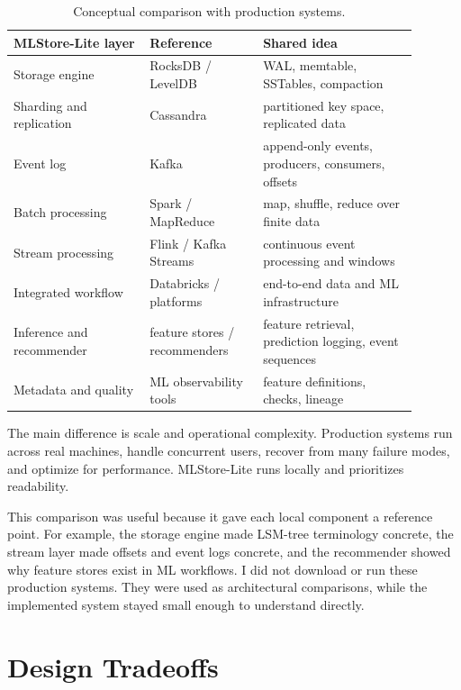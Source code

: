 \begin{table}[!htbp]
\centering
\footnotesize
\setlength{\tabcolsep}{4pt}
\renewcommand{\arraystretch}{0.95}
\begin{tabular}{p{0.30\linewidth} p{0.25\linewidth} p{0.34\linewidth}}
\toprule
\textbf{MLStore-Lite layer} & \textbf{Reference} & \textbf{Shared idea} \\
\midrule
Storage engine & RocksDB / LevelDB & WAL, memtable, SSTables, compaction \\
Sharding and replication & Cassandra & partitioned key space, replicated data \\
Event log & Kafka & append-only events, producers, consumers, offsets \\
Batch processing & Spark / MapReduce & map, shuffle, reduce over finite data \\
Stream processing & Flink / Kafka Streams & continuous event processing and windows \\
Integrated workflow & Databricks / platforms & end-to-end data and ML infrastructure \\
Inference and recommender & feature stores / recommenders & feature retrieval, prediction logging, event sequences \\
Metadata and quality & ML observability tools & feature definitions, checks, lineage \\
\bottomrule
\end{tabular}
\caption{Conceptual comparison with production systems.}
\end{table}

The main difference is scale and operational complexity. Production systems run
across real machines, handle concurrent users, recover from many failure modes,
and optimize for performance. MLStore-Lite runs locally and prioritizes
readability.

This comparison was useful because it gave each local component a reference
point. For example, the storage engine made LSM-tree terminology concrete, the
stream layer made offsets and event logs concrete, and the recommender showed
why feature stores exist in ML workflows. I did not download or run these
production systems. They were used as architectural comparisons, while the
implemented system stayed small enough to understand directly.

\section{Design Tradeoffs}\label{sec:tradeoffs}

